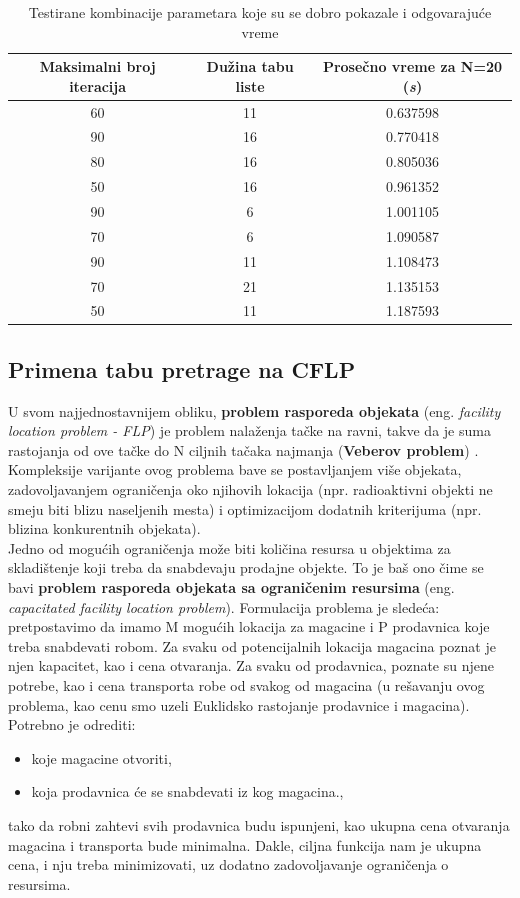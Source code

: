 \documentclass[a4paper]{article}
\begin{document}
\begin{center}
\begin{table}[h]
\caption[long]{Testirane kombinacije parametara koje su se dobro pokazale i odgovarajuće vreme}
\label{tab:dame}

\begin{tabular}{| c c c |}
 \hline
 Maksimalni broj iteracija & Dužina tabu liste & Prosečno vreme za N=20 (\textit{s}) \\ 
 \hline
 60 & 11 & 0.637598 \\  
 90 & 16 & 0.770418 \\  
 80 & 16 & 0.805036 \\ 
 50 & 16 & 0.961352 \\ 
 90 & 6  & 1.001105 \\ 
 70 & 6  & 1.090587 \\ 
 90 & 11 & 1.108473 \\ 
 70 & 21 & 1.135153 \\ 
 50 & 11 & 1.187593 \\ 
 \hline
\end{tabular}
\end{table}
\end{center}

\subsection{Primena tabu pretrage na CFLP}
U svom najjednostavnijem obliku, \textbf{problem rasporeda objekata} (eng. \textit{facility location problem - FLP}) je problem nalaženja tačke na ravni, takve da je suma rastojanja od ove tačke do N ciljnih tačaka najmanja (\textbf{Veberov problem}) \cite{weber}. Kompleksije varijante ovog problema bave se postavljanjem više objekata, zadovoljavanjem ograničenja oko njihovih lokacija (npr. radioaktivni objekti ne smeju biti blizu naseljenih mesta) i optimizacijom dodatnih kriterijuma (npr. blizina konkurentnih objekata).\\

Jedno od mogućih ograničenja može biti količina resursa u objektima za skladištenje koji treba da snabdevaju prodajne objekte. To je baš ono čime se bavi \textbf{problem rasporeda objekata sa ograničenim resursima} (eng. \textit{capacitated facility location problem}). Formulacija problema je sledeća: pretpostavimo da imamo M mogućih lokacija za magacine i P prodavnica koje treba snabdevati robom. Za svaku od potencijalnih lokacija magacina poznat je njen kapacitet, kao i cena otvaranja. Za svaku od prodavnica, poznate su njene potrebe, kao i cena transporta robe od svakog od magacina (u rešavanju ovog problema, kao cenu smo uzeli Euklidsko rastojanje prodavnice i magacina). Potrebno je odrediti:
\begin{itemize}
    \item koje magacine otvoriti,
    \item koja prodavnica će se snabdevati iz kog magacina.,
\end{itemize}
tako da robni zahtevi svih prodavnica budu ispunjeni, kao ukupna cena otvaranja magacina i transporta bude minimalna. Dakle, ciljna funkcija nam je ukupna cena, i nju treba minimizovati, uz dodatno zadovoljavanje ograničenja o resursima.
\end{document}
